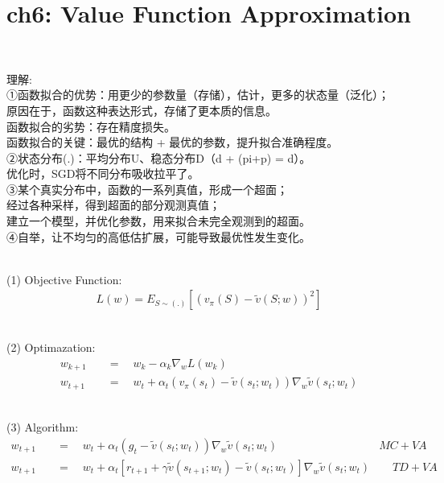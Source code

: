 \documentclass{article}
\begin{document}
\newpage
\section*{ch6: Value Function Approximation}


~ \\[3pt]
\begin{CJK}{UTF8}{gbsn}
    理解: \\[3pt]
    ①函数拟合的优势：用更少的参数量（存储），估计，更多的状态量（泛化）； \\[3pt]
    原因在于，函数这种表达形式，存储了更本质的信息。 \\[3pt]
    函数拟合的劣势：存在精度损失。 \\[3pt]
    函数拟合的关键：最优的结构 + 最优的参数，提升拟合准确程度。 \\[3pt]
    ②状态分布(.)：平均分布U、稳态分布D（d + (pi+p) = d）。 \\[3pt]
    优化时，SGD将不同分布吸收拉平了。 \\[3pt]
    ③某个真实分布中，函数的一系列真值，形成一个超面； \\[3pt]
    经过各种采样，得到超面的部分观测真值； \\[3pt]
    建立一个模型，并优化参数，用来拟合未完全观测到的超面。 \\[3pt]
    ④自举，让不均匀的高低估扩展，可能导致最优性发生变化。 \\[3pt]
\end{CJK}


~ \\[3pt]
(1) Objective Function: 
\begin{align*}
    L(w) = E_{S \sim (.)} 
           [ ( v_{\pi}(S) - \tilde{v}(S; w) )^2 ] 
\end{align*}

~ \\[3pt]
(2) Optimazation: 
\begin{align*}
    w_{k+1} & 
            \quad = \quad w_{k} - \alpha_{k} 
            \nabla_{w} L(w_{k}) \\[3pt]
    w_{t+1} & 
            \quad = \quad w_{t} + \alpha_{t} 
            ( v_{\pi}(s_{t}) - \tilde{v}(s_{t}; w_{t}) ) 
            \nabla_{w} \tilde{v}(s_{t}; w_{t}) 
\end{align*}

~ \\[3pt]
(3) Algorithm: 
\begin{align*}
    w_{t+1} & 
            \quad = \quad w_{t} + \alpha_{t} 
            ( g_{t} - \tilde{v}(s_{t}; w_{t}) ) 
            \nabla_{w} \tilde{v}(s_{t}; w_{t}) 
            \qquad \qquad \qquad \qquad \quad MC+VA \\[3pt]
    w_{t+1} & 
            \quad = \quad w_{t} + \alpha_{t} 
            [ r_{t+1} + \gamma \tilde{v}(s_{t+1}; w_{t}) 
            - \tilde{v}(s_{t}; w_{t}) ] 
            \nabla_{w} \tilde{v}(s_{t}; w_{t}) 
            \qquad TD+VA 
\end{align*}
\end{document}
